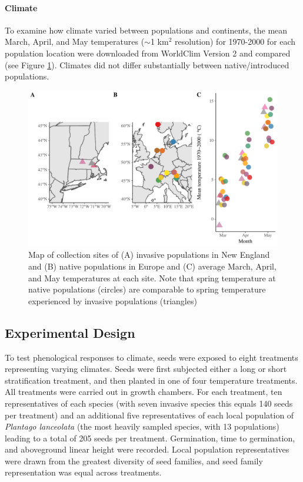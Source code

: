 \documentclass[12pt]{article}\usepackage[]{graphicx}\usepackage[]{color}
\begin{document}
	\paragraph{Climate}
	To examine how climate varied between populations and continents, the mean March, April, and May temperatures ($\sim$1 km$^2$ resolution) for 1970-2000 for each population location were downloaded from WorldClim Version 2 \parencite{Fick2017}  and compared (see Figure \ref{fig:sites}). Climates did not differ substantially between native/introduced populations.  
	
	
	\begin{figure} 
		\centering
		\includegraphics[width=1 \textwidth,trim=0cm 0cm 0cm 0cm, angle=0, scale=.9, origin=c,clip=false]{sampling_sites}
		\caption{Map of collection sites of (A) invasive populations in New England and (B) native populations in Europe and (C) average March, April, and May temperatures at each site. Note that spring temperature at native populations (circles) are comparable to spring temperature experienced by invasive populations (triangles)} 
		\label{fig:sites}
	\end{figure}

	\subsection{Experimental Design} 
	To test phenological responses to climate, seeds were exposed to eight treatments representing varying climates. Seeds were first subjected either a long or short stratification treatment, and then planted in one of four temperature treatments. All treatments were carried out in growth chambers. For each treatment, ten representatives of each species (with seven invasive species this equals 140 seeds per treatment) and an additional five representatives of each local population of \textit{Plantago lanceolata} (the most heavily sampled species, with 13 populations) leading to a total of 205 seeds per treatment. Germination, time to germination, and aboveground linear height were recorded. Local population representatives were drawn from the greatest diversity of seed families, and seed family representation was equal across treatments. 
	
\end{document}
